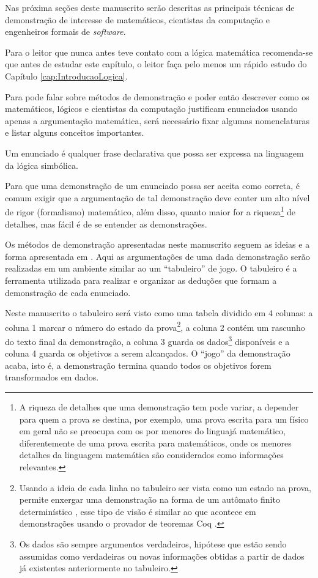 Nas próxima seções deste manuscrito serão descritas as principais técnicas de demonstração de interesse de matemáticos, cientistas da computação e engenheiros formais de \textit{software}. 

\begin{rema}
	Para o leitor que nunca antes teve contato com a lógica matemática recomenda-se que antes de estudar este capítulo, o leitor faça pelo menos um rápido estudo do Capítulo \ref{cap:IntroducaoLogica}.
\end{rema}

Para pode falar sobre métodos de demonstração e poder então descrever como os matemáticos, lógicos e cientistas da computação justificam enunciados usando apenas a argumentação matemática, será necessário fixar algumas nomenclaturas e listar alguns conceitos importantes.

\begin{definition}[Enunciado]\label{def:Enunciado}
	Um enunciado é qualquer frase declarativa que possa ser expressa na linguagem da lógica simbólica.
\end{definition}

Para que uma demonstração de um enunciado possa ser aceita como correta, é comum exigir que a argumentação de tal demonstração deve conter um alto nível de rigor (formalismo) matemático, além disso, quanto maior for a riqueza\footnote{A riqueza de detalhes que uma demonstração tem pode variar, a depender para quem a prova se destina, por exemplo, uma prova escrita para um físico em geral não se preocupa com os por menores do linguajá matemático, diferentemente de uma prova escrita para matemáticos, onde os menores detalhes da linguagem matemática são considerados como informações relevantes.} de detalhes, mas fácil é de se entender as demonstrações.

Os métodos de demonstração apresentadas neste manuscrito seguem as ideias e a forma apresentada em \cite{velleman2019comProvar}. Aqui as argumentações de uma dada demonstração serão realizadas em um ambiente similar ao um ``tabuleiro'' de jogo. O tabuleiro é a ferramenta utilizada para realizar e organizar as deduções que formam a demonstração de cada enunciado. 

Neste manuscrito o tabuleiro será visto como uma tabela dividido em 4 colunas: a coluna 1 marcar o número do estado da prova\footnote{Usando a ideia de cada linha no tabuleiro ser vista como um estado na prova, permite enxergar uma demonstração na forma de um autômato finito determinístico \cite{hopcroft2008}, esse tipo de visão é similar ao que acontece em demonstrações usando o provador de teoremas Coq \cite{coq2013}.}, a coluna 2 contém um rascunho do texto final da demonstração, a coluna 3 guarda os dados\footnote{Os dados são sempre argumentos verdadeiros, hipótese que estão sendo assumidas como verdadeiras ou novas informações obtidas a partir de dados já existentes anteriormente no tabuleiro.} disponíveis e a coluna 4 guarda os objetivos a serem alcançados.  O ``jogo'' da demonstração acaba, isto é, a demonstração termina quando  todos os objetivos forem transformados em dados.

